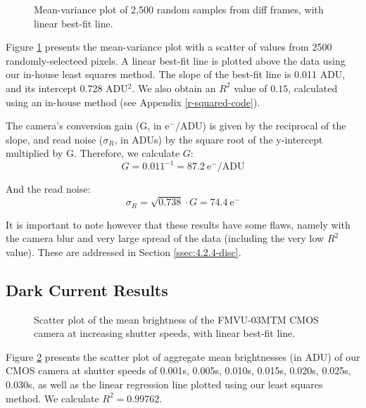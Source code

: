 \documentclass[preprint2]{aastex702}
\begin{document}
			\begin{figure}
				\caption{Mean-variance plot of 2,500 random samples from diff frames, with linear best-fit line.}
				\label{fig:4.2.4-mu-var}
			\end{figure}			

			Figure \ref{fig:4.2.4-mu-var} presents the mean-variance plot with a scatter of values from 2500 randomly-selecteed pixels. A linear best-fit line is plotted above the data using our in-house least squares method. The slope of the best-fit line is 0.011 ADU, and its intercept 0.728 ADU$^2$. We also obtain an $R^2$ value of $0.15$, calculated using an in-house method (see Appendix \ref{r-squared-code}).

			The camera's conversion gain (G, in e$^-/$ADU) is given by the reciprocal of the slope, and read noise ($\sigma_R$, in ADUs) by the square root of the y-intercept multiplied by G. Therefore, we calculate $G$:
			\begin{equation}\label{eq:calc-gain}
				G = 0.011^{-1} = 87.2 \ \text{e}^-/\text{ADU}
			\end{equation}

			And the read noise:
			\begin{equation}\label{eq:calc-readnoise}
				\sigma_R = \sqrt{0.738} \cdot G = 74.4\ \text{e}^-
			\end{equation}

			It is important to note however that these results have some flaws, namely with the camera blur and very large spread of the data (including the very low $R^2$ value). These are addressed in Section \ref{ssec:4.2.4-disc}. 

		\subsection{Dark Current Results}\label{ssec:4.2.5-results}

			\begin{figure}
				\caption{Scatter plot of the mean brightness of the FMVU-03MTM CMOS camera at increasing shutter speeds, with linear best-fit line.}
				\label{fig:plot-4.2.5}
			\end{figure}

			Figure \ref{fig:plot-4.2.5} presents the scatter plot of aggregate mean brightnesses (in ADU) of our CMOS camera at shutter speeds of 0.001s, 0.005s, 0.010s, 0.015s, 0.020s, 0.025s, 0.030s, as well as the linear regression line plotted using our least squares method. We calculate $R^2 = 0.99762$.
\end{document}
